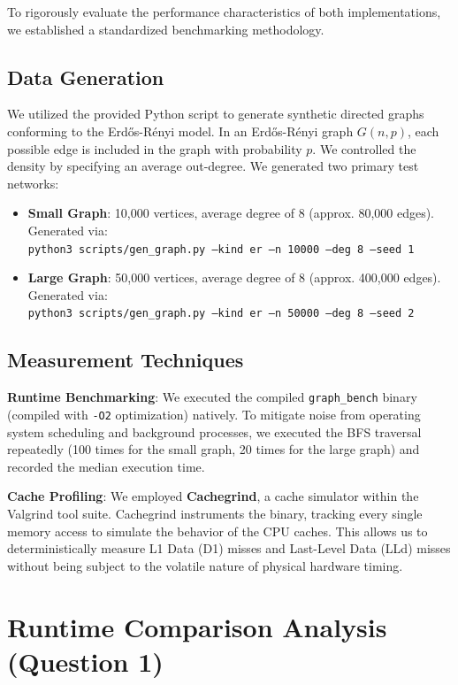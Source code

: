 \documentclass[11pt]{article}
\begin{document}
To rigorously evaluate the performance characteristics of both implementations, we established a standardized benchmarking methodology.

\subsection{Data Generation}
We utilized the provided Python script to generate synthetic directed graphs conforming to the Erd\H{o}s-R\'enyi model. In an Erd\H{o}s-R\'enyi graph $G(n, p)$, each possible edge is included in the graph with probability $p$. We controlled the density by specifying an average out-degree. We generated two primary test networks:
\begin{itemize}
    \item \textbf{Small Graph}: 10,000 vertices, average degree of 8 (approx. 80,000 edges). Generated via: \\ \texttt{python3 scripts/gen\_graph.py --kind er --n 10000 --deg 8 --seed 1}
    \item \textbf{Large Graph}: 50,000 vertices, average degree of 8 (approx. 400,000 edges). Generated via: \\ \texttt{python3 scripts/gen\_graph.py --kind er --n 50000 --deg 8 --seed 2}
\end{itemize}

\subsection{Measurement Techniques}
\textbf{Runtime Benchmarking}: We executed the compiled \texttt{graph\_bench} binary (compiled with \texttt{-O2} optimization) natively. To mitigate noise from operating system scheduling and background processes, we executed the BFS traversal repeatedly (100 times for the small graph, 20 times for the large graph) and recorded the median execution time. 

\textbf{Cache Profiling}: We employed \textbf{Cachegrind}, a cache simulator within the Valgrind tool suite. Cachegrind instruments the binary, tracking every single memory access to simulate the behavior of the CPU caches. This allows us to deterministically measure L1 Data (D1) misses and Last-Level Data (LLd) misses without being subject to the volatile nature of physical hardware timing.

\section{Runtime Comparison Analysis (Question 1)}
\end{document}
